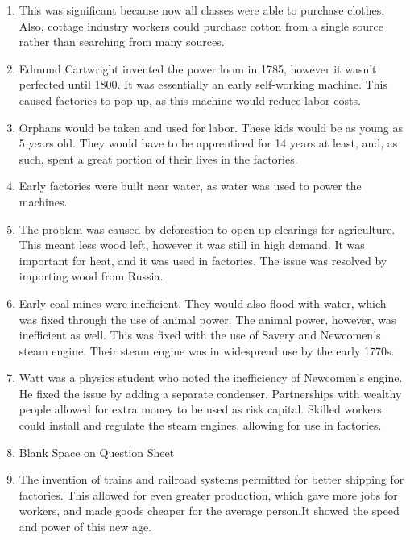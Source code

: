 \documentclass[12pt]{article}
\begin{document}
\begin{enumerate}
\begin{itemize}[label=$\circ$]
\end{itemize}

\item This was significant because now all classes were able to purchase clothes. Also, cottage industry workers could purchase cotton from a single source rather than searching from many sources.

\item Edmund Cartwright invented the power loom in 1785, however it wasn't perfected until 1800. It was essentially an early self-working machine. This caused factories to pop up, as this machine would reduce labor costs.

\item Orphans would be taken and used for labor. These kids would be as young as 5 years old. They would have to be apprenticed for 14 years at least, and, as such, spent a great portion of their lives in the factories.

\item Early factories were built near water, as water was used to power the machines.

\item The problem was caused by deforestion to open up clearings for agriculture. This meant less wood left, however it was still in high demand. It was important for heat, and it was used in factories. The issue was resolved by importing wood from Russia.

\item Early coal mines were inefficient. They would also flood with water, which was fixed through the use of animal power. The animal power, however, was inefficient as well. This was fixed with the use of Savery and Newcomen's steam engine. Their steam engine was in widespread use by the early 1770s.

\item Watt was a physics student who noted the inefficiency of Newcomen's engine. He fixed the issue by adding a separate condenser. Partnerships with wealthy people allowed for extra money to be used as risk capital. Skilled workers could install and regulate the steam engines, allowing for use in factories.

\item Blank Space on Question Sheet

\item The invention of trains and railroad systems permitted for better shipping for factories. This allowed for even greater production, which gave more jobs for workers, and made goods cheaper for the average person.It showed the speed and power of this new age.


\end{enumerate}
\end{document}
